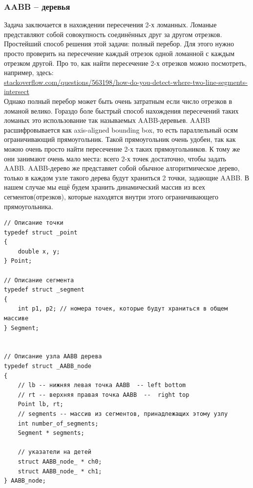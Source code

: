 \documentclass{article}
\begin{document}
\subsubsection*{AABB -- деревья}
Задача заключается в нахождении пересечения 2-х ломанных. Ломаные представляют собой совокупность соединённых друг за другом отрезков. Простейший способ решения этой задачи: полный перебор. Для этого нужно просто проверить на пересечение каждый отрезок одной ломанной с каждым отрезком другой. Про то, как найти пересечение 2-х отрезков можно посмотреть, например, здесь:\\ \href{http://stackoverflow.com/questions/563198/how-do-you-detect-where-two-line-segments-intersect}{stackoverflow.com/questions/563198/how-do-you-detect-where-two-line-segments-intersect}  \\
Однако полный перебор может быть очень затратным если число отрезков в ломаной велико. Гораздо боле быстрый способ нахождения пересечений таких ломаных это использование так называемых AABB-деревьев. AABB расшифровывается как axis-aligned bounding box, то есть параллельный осям ограничивающий прямоугольник. Такой прямоугольник очень удобен, так как можно очень просто найти пересечение 2-х таких прямоугольников. К тому же они занимают очень мало места: всего 2-х точек достаточно, чтобы задать AABB. AABB-дерево же представяет собой обычное алгоритмическое дерево, только в каждом узле такого дерева будут храниться 2 точки, задающие AABB. В нашем случае мы ещё будем хранить динамический массив из всех сегментов(отрезков), которые находятся внутри этого ограничивающего прямоугольника. \\

\begin{verbatim}
// Описание точки
typedef struct _point
{
    double x, y;
} Point;

// Описание сегмента
typedef struct _segment
{
    int p1, p2; // номера точек, которые будут храниться в общем массиве
} Segment;


// Описание узла AABB дерева
typedef struct _AABB_node
{
    // lb -- нижняя левая точка AABB  -- left bottom
    // rt -- верхняя правая точка AABB  --  right top
    Point lb, rt;
    // segments -- массив из сегментов, принадлежащих этому узлу
    int number_of_segments;
    Segment * segments;
    
    // указатели на детей
    struct AABB_node_ * ch0;
    struct AABB_node_ * ch1;
} AABB_node;

\end{verbatim}
\end{document}
